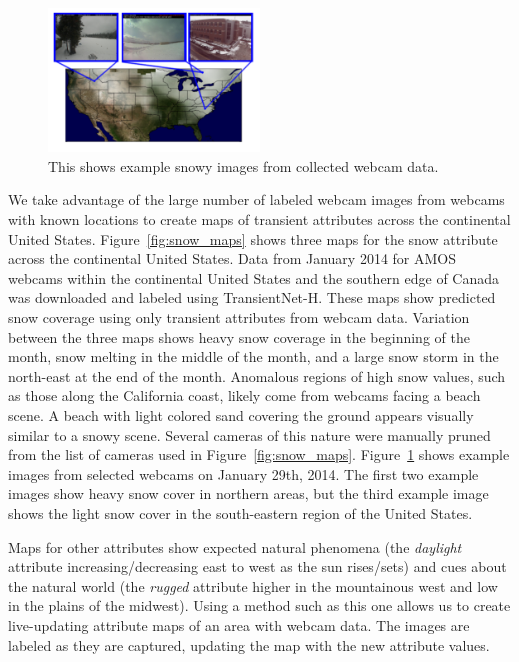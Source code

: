 \documentclass[10pt,twocolumn,letterpaper]{article}
\newcommand{\figref}[1]{Figure~\ref{fig:#1}}
\begin{document}
\begin{figure}[t]
	\centering
		\includegraphics[width=0.5\textwidth, trim= 0mm 10mm 0mm 0mm]{figs/snow_exs.pdf}
		\caption{This shows example snowy images from collected webcam data.}
		\label{fig:snow_exs}
\end{figure}

We take advantage of the large number of labeled webcam images from webcams
with known locations to create maps of transient attributes across the
continental United States.  \figref{snow_maps} shows three maps for the snow
attribute across the continental United States.  Data from January 2014 for
AMOS webcams within the continental United States and the southern edge of
Canada was downloaded and labeled using TransientNet-H.  These maps show
predicted snow coverage using only transient attributes from webcam data.
Variation between the three maps shows heavy snow coverage in the beginning of
the month, snow melting in the middle of the month, and a large snow storm in
the north-east at the end of the month.  Anomalous regions of high snow values,
such as those along the California coast, likely come from webcams facing a
beach scene.  A beach with light colored sand covering the ground appears
visually similar to a snowy scene.  Several cameras of this nature were
manually pruned from the list of cameras used in \figref{snow_maps}.
\figref{snow_exs} shows example images from selected webcams on January 29th,
2014. The first two example images show heavy snow cover in northern areas, but
the third example image shows the light snow cover in the south-eastern region
of the United States.  

Maps for other attributes show expected natural phenomena (the
\textit{daylight} attribute increasing/decreasing east to west as the sun
rises/sets) and cues about the natural world (the \textit{rugged} attribute
higher in the mountainous west and low in the plains of the midwest).  Using a
method such as this one allows us to create live-updating attribute maps of an
area with webcam data.  The images are labeled as they are captured, updating
the map with the new attribute values. 
\end{document}
